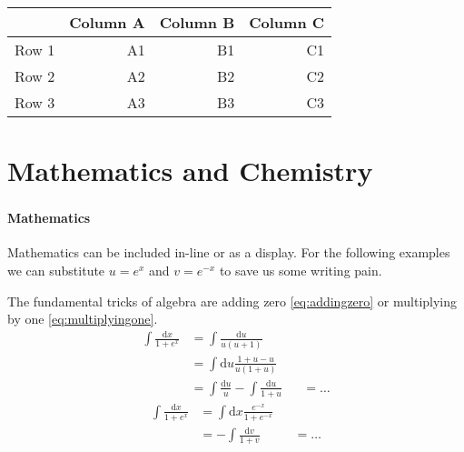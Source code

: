 \documentclass[10pt,compress,
               xcolor={dvipsnames,table},
               hyperref={breaklinks}
              ]{beamer}
\newcommand{\diff}{\mathrm{d}} %
\begin{document}
\begin{frame}
\frametitle{\insertsection}
\centering
{}
\begin{tabular}{lrrr}
  \toprule
         & Column A & Column B & Column C \\
  \midrule
  Row 1  & A1       & B1       & C1       \\
  Row 2  & A2       & B2       & C2       \\
  Row 3  & A3       & B3       & C3       \\
  \bottomrule
\end{tabular}
\end{frame}

\section{Mathematics and Chemistry}
\begin{frame}
  \frametitle{\insertsection}
  \framesubtitle{Mathematics}
  Mathematics can be included in-line or as a display. 
  For the following examples we can substitute \(u=e^x\) and \(v=e^{-x}\) 
  to save us some writing pain.
  
  The fundamental tricks of algebra are adding zero \eqref{eq:addingzero} %
  or multiplying by one \eqref{eq:multiplyingone}.
  \begin{subequations}
    \begin{align}\label{eq:addingzero}
      \int \frac{\diff x}{1 + e^x} &= \int \frac{\diff u}{u (u + 1)}\\ 
        &= \int \diff u \frac{1 + u - u}{u (1 + u)} \\
        &= \int \frac{\diff u}{u} - \int \frac{\diff u}{1 + u}
        &&= \ldots
    \end{align}
  \end{subequations}
  \begin{subequations}
    \begin{align}\label{eq:multiplyingone}
      \int \frac{\diff x}{1 + e^x} &= \int \diff x \frac{e^{-x}}{1 + e^{-x}} \\
        &= -\int \frac{\diff v}{1 + v}
        &&= \ldots
    \end{align}
  \end{subequations}
\end{frame}
\end{document}
